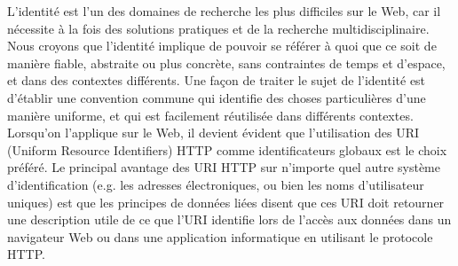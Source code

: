 L'identité est l'un des domaines de recherche les plus difficiles sur le Web, car il nécessite à la fois des solutions pratiques et de la recherche multidisciplinaire. Nous croyons que l'identité implique de pouvoir se référer à quoi que ce soit de manière fiable, abstraite ou plus concrète, sans contraintes de temps et d'espace, et dans des contextes différents. Une façon de traiter le sujet de l'identité est d'établir une convention commune qui identifie des choses particulières d'une manière uniforme, et qui est facilement réutilisée dans différents contextes. Lorsqu'on l'applique sur le Web, il devient évident que l'utilisation des URI (Uniform Resource Identifiers) HTTP comme identificateurs globaux est le choix préféré. Le principal avantage des URI HTTP sur n'importe quel autre système d'identification (e.g. les adresses électroniques, ou bien les noms d'utilisateur uniques) est que les principes de données liées disent que ces URI doit retourner une description utile de ce que l'URI identifie lors de l'accès aux données dans un navigateur Web ou dans une application informatique en utilisant le protocole HTTP.\\



